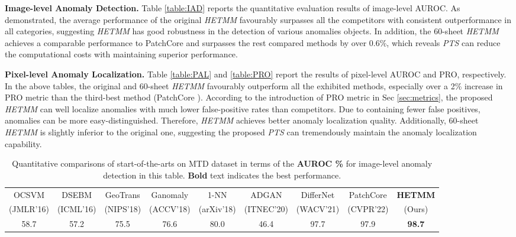 \documentclass[default,iicol]{sn-jnl}\usepackage[algo2e,ruled,linesnumbered]{algorithm2e}
\theoremstyle{thmstyleone}\newtheorem{theorem}{Theorem}\newtheorem{proposition}[theorem]{Proposition}
\theoremstyle{thmstyletwo}\newtheorem{example}{Example}\newtheorem{remark}{Remark}
\theoremstyle{thmstylethree}\newtheorem{definition}{Definition}
\begin{document}
\noindent\textbf{Image-level Anomaly Detection. }
Table \ref{table:IAD} reports the quantitative evaluation results of image-level AUROC.
As demonstrated, the average performance of the original \textit{HETMM} favourably surpasses all the competitors with consistent outperformance in all categories, suggesting \textit{HETMM} has good robustness in the detection of various anomalies objects.
In addition, the 60-sheet \textit{HETMM} achieves a comparable performance to PatchCore \cite{patchcore} and surpasses the rest compared methods by over 0.6\%, which reveals \textit{PTS} can reduce the computational costs with maintaining superior performance.

\noindent\textbf{Pixel-level Anomaly Localization. }
Table \ref{table:PAL} and \ref{table:PRO} report the results of pixel-level AUROC and PRO, respectively.
In the above tables, the original and 60-sheet \textit{HETMM} favourably outperform all the exhibited methods, especially over a 2\% increase in PRO metric than the third-best method (PatchCore \cite{patchcore}).
According to the introduction of PRO metric in Sec \ref{sec:metrics}, the proposed \textit{HETMM} can well localize anomalies with much lower false-positive rates than competitors.
Due to containing fewer false positives, anomalies can be more easy-distinguished. 
Therefore, \textit{HETMM} achieves better anomaly localization quality.
Additionally, 60-sheet \textit{HETMM} is slightly inferior to the original one, suggesting the proposed \textit{PTS} can tremendously maintain the anomaly localization capability.

\begin{table*}[!t]
    \caption{
    Quantitative comparisons of start-of-the-arts on MTD dataset in terms of the \textbf{AUROC \%} for image-level anomaly detection in this table. 
    \textbf{Bold} text indicates the best performance.
    }
    \centering
    \tiny
    \setlength{\tabcolsep}{1.7mm}
    \begin{tabular}{ccccccccc}
    \hline                
    OCSVM\cite{OCSVM} &DSEBM\cite{DSEBM} &GeoTrans\cite{GeoTrans} &Ganomaly\cite{AUROC} &1-NN\cite{1-NN} &ADGAN\cite{ADGAN} &DifferNet\cite{DifferNet} &PatchCore\cite{patchcore} &\textbf{HETMM} \\
    (JMLR'16)         &(ICML'16)         &(NIPS'18)               &(ACCV'18)            &(arXiv'18)      &(ITNEC'20)         &(WACV'21)                &(CVPR'22)&(Ours)             \\
    \hline    
    58.7              &57.2              &75.5                    &76.6                 &80.0            &46.4                &97.7                   &97.9                      &\textbf{98.7}            \\
    \hline
    \end{tabular}
    \label{table:MTD}
\end{table*}
\end{document}
